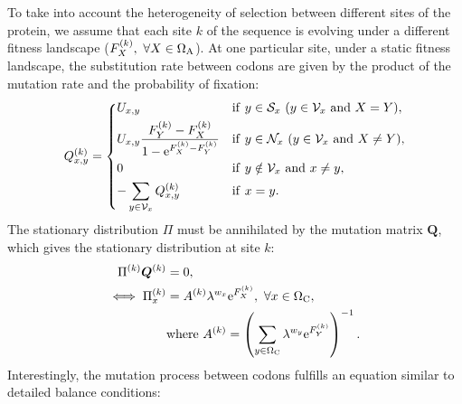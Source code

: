To take into account the heterogeneity of selection between different sites of the protein, we assume that each site $k$ of the sequence is evolving under a different fitness landscape ($F_X^{(k)}, \ \forall X \in \Omega_{\mathrm{A}} $).
At one particular site, under a static fitness landscape, the substitution rate between codons are given by the product of the mutation rate and the probability of fixation:
\begin{equation}
\label{codonSubRates}
Q_{x, y}^{(k)} =
\begin{dcases}
U_{x, y}
& \mathrm{if} \ y \in \mathcal{S}_x \ (y \in \mathcal{V}_x \ \mathrm{and} \ X = Y),  \\
U_{x, y} \dfrac{F_Y^{(k)} - F_X^{(k)}}{1 - \mathrm{e}^{F_X^{(k)} - F_Y^{(k)}}}
& \mathrm{if} \ y \in \mathcal{N}_x \ (y \in \mathcal{V}_x \ \mathrm{and} \ X \neq Y),  \\
0
& \mathrm{if} \  y \notin \mathcal{V}_x \ \mathrm{ and } \ x \neq y, \\
- \sum_{y \in \mathcal{V}_x }  Q_{x, y}^{(k)}
& \mathrm{if} \ x = y.  \\
\end{dcases}
\end{equation}
The stationary distribution $\Pi$ must be annihilated by the mutation matrix $\bm{Q}$, which gives the stationary distribution at site $k$:
\begin{align}
\Pi^{(k)} \bm{Q}^{(k)}
& =0 ,\\
\iff \Pi_x^{(k)}
& =A^{(k)} \lambda^{w_x} \mathrm{e}^{F_X^{(k)}} ,\ \forall x \in \Omega_{\mathrm{C}},\\
& \mathrm{ where } \ A^{(k)} = \left( \sum_{y \in \Omega_{\mathrm{C}}} \lambda^{w_y} \mathrm{e}^{F_Y^{(k)}} \right)^{-1}.
\label{codonStationarity}
\end{align}
Interestingly, the mutation process between codons fulfills an equation similar to detailed balance conditions:
